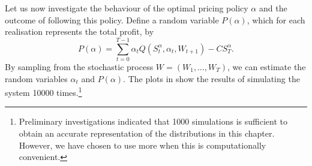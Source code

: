 \documentclass[main.tex]{subfiles}
\begin{document}
Let us now investigate the behaviour of the optimal pricing policy
$\alpha$ and
the outcome of following this policy.
Define a random variable $P(\alpha)$, which for each realisation
represents the total profit, by
\begin{equation}
  P(\alpha) = \sum_{t=0}^{T-1}\alpha_tQ(S_t^\alpha,\alpha_t,W_{t+1}) - CS_T^\alpha.
\end{equation}
By sampling from the stochastic process $W=(W_1,\dots,W_T)$, we can
estimate the random variables $\alpha_t$ and $P(\alpha)$.
The plots in  show the results of
simulating the system \num{10000} times.\footnote{Preliminary
  investigations indicated that \num{1000}
  simulations is sufficient to obtain an accurate representation of
  the distributions in this chapter. However, we have chosen to use
  more when this is computationally convenient.
}
\end{document}
